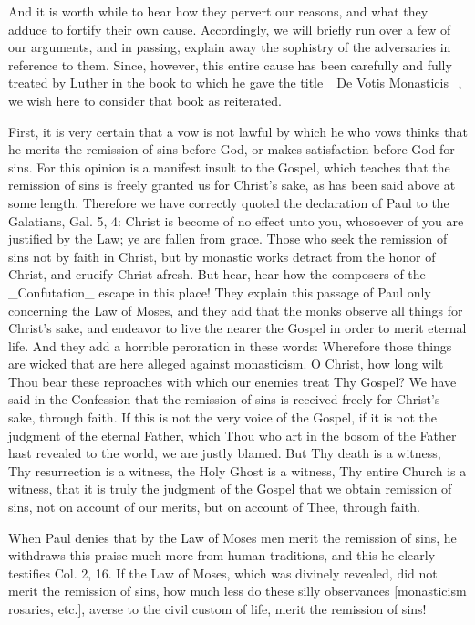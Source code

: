 And it is worth while to hear how they pervert our reasons, and what
they adduce to fortify their own cause.  Accordingly, we will briefly
run over a few of our arguments, and in passing, explain away the
sophistry of the adversaries in reference to them.  Since, however,
this entire cause has been carefully and fully treated by Luther in
the book to which he gave the title _De Votis Monasticis_, we wish
here to consider that book as reiterated.

First, it is very certain that a vow is not lawful by which he who
vows thinks that he merits the remission of sins before God, or makes
satisfaction before God for sins.  For this opinion is a manifest
insult to the Gospel, which teaches that the remission of sins is
freely granted us for Christ's sake, as has been said above at some
length.  Therefore we have correctly quoted the declaration of Paul
to the Galatians, Gal. 5, 4: Christ is become of no effect unto you,
whosoever of you are justified by the Law; ye are fallen from grace.
Those who seek the remission of sins not by faith in Christ, but by
monastic works detract from the honor of Christ, and crucify Christ
afresh.  But hear, hear how the composers of the _Confutation_ escape
in this place!  They explain this passage of Paul only concerning the
Law of Moses, and they add that the monks observe all things for
Christ's sake, and endeavor to live the nearer the Gospel in order to
merit eternal life.  And they add a horrible peroration in these
words: Wherefore those things are wicked that are here alleged
against monasticism.  O Christ, how long wilt Thou bear these
reproaches with which our enemies treat Thy Gospel?  We have said in
the Confession that the remission of sins is received freely for
Christ's sake, through faith.  If this is not the very voice of the
Gospel, if it is not the judgment of the eternal Father, which Thou
who art in the bosom of the Father hast revealed to the world, we are
justly blamed.  But Thy death is a witness, Thy resurrection is a
witness, the Holy Ghost is a witness, Thy entire Church is a witness,
that it is truly the judgment of the Gospel that we obtain remission
of sins, not on account of our merits, but on account of Thee,
through faith.

When Paul denies that by the Law of Moses men merit the remission of
sins, he withdraws this praise much more from human traditions, and
this he clearly testifies Col. 2, 16. If the Law of Moses, which was
divinely revealed, did not merit the remission of sins, how much less
do these silly observances [monasticism rosaries, etc.], averse to
the civil custom of life, merit the remission of sins!


